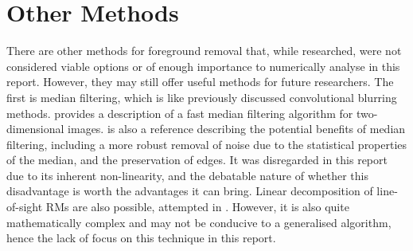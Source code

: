 \section{Other Methods}
\label{sec:other_methods}

There are other methods for foreground removal that, while researched, were not considered viable options or of enough importance to numerically analyse in this report. However, they may still offer useful methods for future researchers. The first is median filtering, which is like previously discussed convolutional blurring methods. \cite{ID39} provides a description of a fast median filtering algorithm for two-dimensional images. \cite{ID40} is also a reference describing the potential benefits of median filtering, including a more robust removal of noise due to the statistical properties of the median, and the preservation of edges. It was disregarded in this report due to its inherent non-linearity, and the debatable nature of whether this disadvantage is worth the advantages it can bring. Linear decomposition of line-of-sight RMs are also possible, attempted in \cite{ID21}. However, it is also quite mathematically complex and may not be conducive to a generalised algorithm, hence the lack of focus on this technique in this report.


